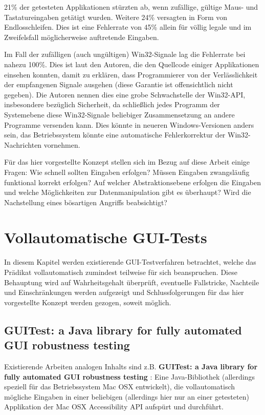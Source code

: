 21\% der getesteten Applikationen stürzten ab, wenn zufällige, gültige Maus- und Tastatureingaben 
getätigt wurden. Weitere 24\% versagten in Form von Endlosschleifen. Dies ist eine Fehlerrate von 45\%
allein für völlig legale und im Zweifelsfall möglicherweise auftretende Eingaben.

Im Fall der zufälligen (auch ungültigen) Win32-Signale lag die Fehlerrate bei nahezu 100\%. Dies ist
laut den Autoren, die den Quellcode einiger Applikationen einsehen konnten, damit zu erklären,
dass Programmierer von der Verlässlichkeit der empfangenen Signale ausgehen (diese Garantie ist offensichtlich
nicht gegeben). Die Autoren nennen dies eine grobe Schwachstelle der Win32-API, insbesondere bezüglich
Sicherheit, da schließlich jedes Programm der Systemebene diese Win32-Signale beliebiger Zusammensetzung
an andere Programme versenden kann. Dies könnte in neueren Windows-Versionen anders sein, das Betriebssystem
könnte eine automatische Fehlerkorrektur der Win32-Nachrichten vornehmen.

Für das hier vorgestellte Konzept stellen sich im Bezug auf diese Arbeit einige Fragen:
Wie schnell sollten Eingaben erfolgen? Müssen Eingaben zwangsläufig funktional korrekt erfolgen?
Auf welcher Abstraktionsebene erfolgen die Eingaben und welche Möglichkeiten zur Datenmanipulation
gibt es überhaupt? Wird die Nachstellung eines bösartigen Angriffs beabsichtigt?


\section{\glqq{}Vollautomatische\grqq{} GUI-Tests}\label{chapter:introfullautoguitesting}


In diesem Kapitel werden existierende GUI-Testverfahren betrachtet, welche das Prädikat
\glqq{}vollautomatisch\grqq{} zumindest teilweise für sich beanspruchen. Diese Behauptung wird
auf Wahrheitsgehalt überprüft, eventuelle Fallstricke, Nachteile und Einschränkungen werden aufgezeigt
und Schlussfolgerungen für das hier vorgestellte Konzept werden gezogen, soweit möglich.



\subsection{GUITest: a Java library for fully automated GUI robustness testing}

Existierende Arbeiten analogen Inhalts sind z.B. \textbf{\glqq{}GUITest: a Java library for fully automated
GUI robustness testing\grqq{}} \cite{GUITestBauersfeld}: Eine Java-Bibliothek 
(allerdings speziell für das Betriebssystem Mac OSX entwickelt), die
vollautomatisch mögliche Eingaben in einer beliebigen (allerdings hier nur an einer getesteten)
Applikation der \glqq{}Mac OSX Accessibility API\grqq{} aufspürt und durchführt.


